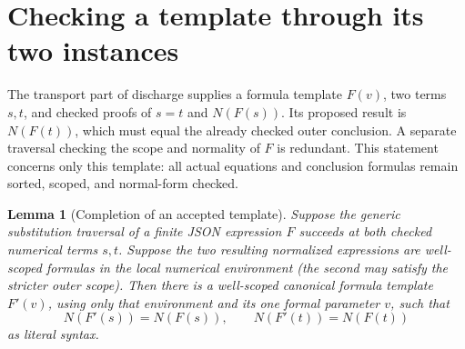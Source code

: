 \documentclass[11pt]{article}
\newtheorem{lemma}[theorem]{Lemma}
\theoremstyle{definition}\newtheorem{definition}[theorem]{Definition}
\theoremstyle{remark}\newtheorem{remark}[theorem]{Remark}
\begin{document}
\section{Checking a template through its two instances}
\label{sec:template-completion}

The transport part of discharge supplies a formula template $F(v)$,
two terms $s,t$, and checked proofs of $s=t$ and $N(F(s))$.
Its proposed result is $N(F(t))$, which must equal the already checked
outer conclusion.  A separate traversal checking the scope and normality
of $F$ is redundant.  This statement concerns only this template: all
actual equations and conclusion formulas remain sorted, scoped, and
normal-form checked.

\begin{lemma}[Completion of an accepted template]
Suppose the generic substitution traversal of a finite JSON expression
$F$ succeeds at both checked numerical terms $s,t$.  Suppose the two
resulting normalized expressions are well-scoped formulas in the local
numerical environment (the second may satisfy the stricter outer scope).
Then there is a well-scoped canonical formula template $F'(v)$, using
only that environment and its one formal parameter $v$, such that
\[
                  N(F'(s))=N(F(s)),\qquad
                  N(F'(t))=N(F(t))
\]
as literal syntax.
\end{lemma}
\end{document}
